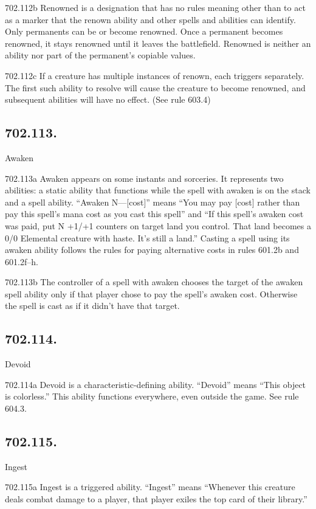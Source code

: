 702.112b Renowned is a designation that has no rules meaning other than to act as a marker that the renown ability and other spells and abilities can identify. Only permanents can be or become renowned. Once a permanent becomes renowned, it stays renowned until it leaves the battlefield. Renowned is neither an ability nor part of the permanent’s copiable values.

702.112c If a creature has multiple instances of renown, each triggers separately. The first such ability to resolve will cause the creature to become renowned, and subsequent abilities will have no effect. (See rule 603.4)

\subsection*{702.113.}
Awaken

702.113a Awaken appears on some instants and sorceries. It represents two abilities: a static ability that functions while the spell with awaken is on the stack and a spell ability. “Awaken N—[cost]” means “You may pay [cost] rather than pay this spell’s mana cost as you cast this spell” and “If this spell’s awaken cost was paid, put N +1/+1 counters on target land you control. That land becomes a 0/0 Elemental creature with haste. It’s still a land.” Casting a spell using its awaken ability follows the rules for paying alternative costs in rules 601.2b and 601.2f–h.

702.113b The controller of a spell with awaken chooses the target of the awaken spell ability only if that player chose to pay the spell’s awaken cost. Otherwise the spell is cast as if it didn’t have that target.

\subsection*{702.114.}
Devoid

702.114a Devoid is a characteristic-defining ability. “Devoid” means “This object is colorless.” This ability functions everywhere, even outside the game. See rule 604.3.

\subsection*{702.115.}
Ingest

702.115a Ingest is a triggered ability. “Ingest” means “Whenever this creature deals combat damage to a player, that player exiles the top card of their library.”

